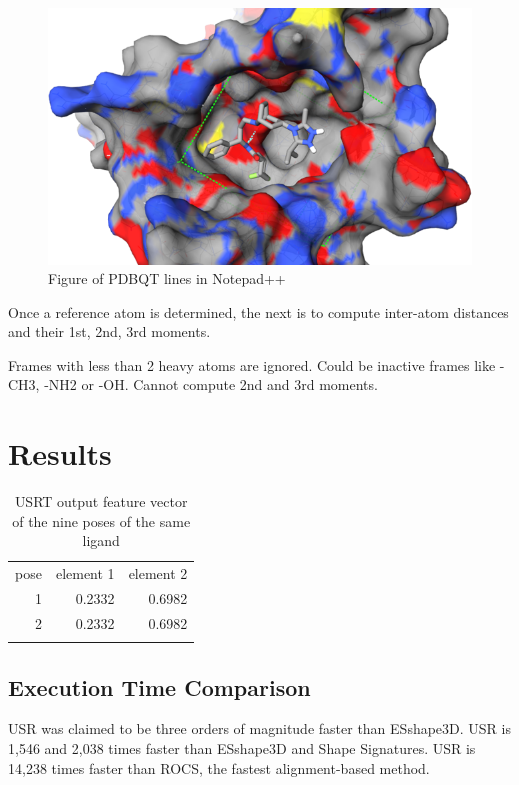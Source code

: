 \documentclass[twocolumn]{svjour3}          %
\begin{document}
\begin{figure}
\endminipage
{}
\centering
\includegraphics[width=1.36\textwidth,natwidth=638,natheight=386]{../usrt/MRV1.png}
\endminipage
\caption{Figure of PDBQT lines in Notepad++}
\label{fig:T27}
\end{figure}

Once a reference atom is determined, the next is to compute inter-atom distances and their 1st, 2nd, 3rd moments.

Frames with less than 2 heavy atoms are ignored. Could be inactive frames like -CH3, -NH2 or -OH. Cannot compute 2nd and 3rd moments.

\section{Results}

\begin{table}
\caption{USRT output feature vector of the nine poses of the same ligand}
\label{tab:1}
\begin{tabular}{rrr}
\hline\noalign{\smallskip}
pose & element 1 & element 2\\
\noalign{\smallskip}\hline\noalign{\smallskip}
1 & 0.2332 & 0.6982\\
2 & 0.2332 & 0.6982\\
\noalign{\smallskip}\hline
\end{tabular}
\end{table}

\subsection{Execution Time Comparison}

USR was claimed to be three orders of magnitude faster than ESshape3D. USR is 1,546 and 2,038 times faster than ESshape3D and Shape Signatures. USR is 14,238 times faster than ROCS, the fastest alignment-based method.
\end{document}
